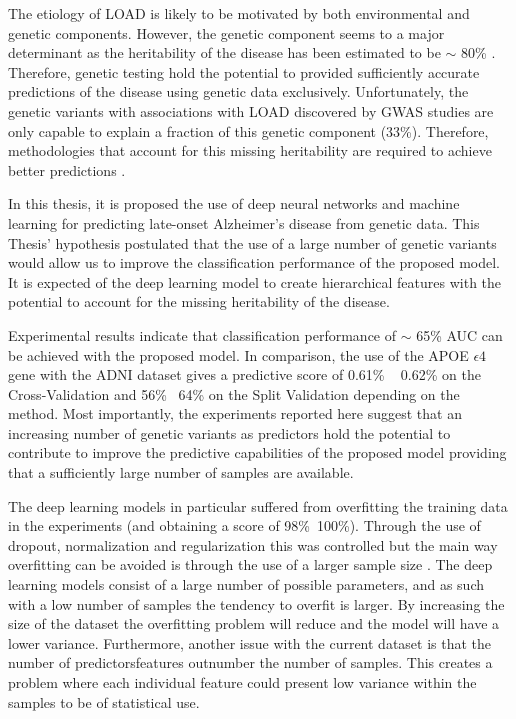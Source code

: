 The etiology of LOAD is likely to be motivated by both environmental and genetic components. However, the genetic component seems to a major determinant as the heritability of the disease has been estimated to be $\sim$ 80\% \cite{Raghavan2017}. Therefore, genetic testing hold the potential to provided sufficiently accurate predictions of the disease using genetic data exclusively. Unfortunately, the genetic variants with associations with LOAD discovered by GWAS studies are only capable to explain a fraction of this genetic component (33\%). Therefore, methodologies that account for this missing heritability are required to achieve better predictions \cite{Escott015} \cite{Escott2017}.

In this thesis, it is proposed the use of deep neural networks and machine learning  for predicting late-onset Alzheimer's disease from genetic data. This Thesis' hypothesis postulated that the use of a large number of genetic variants would allow us to improve the classification performance of the proposed model. It is expected of the deep learning model to create hierarchical features with the potential to account for the missing heritability of the disease.

Experimental results indicate that classification performance of $\sim$ 65\% AUC can be achieved with the proposed model. In comparison, the use of the APOE $\epsilon4$ gene with the ADNI dataset gives a predictive score of 0.61\% ~ 0.62\% on the Cross-Validation and 56\% ~64\% on the Split Validation depending on the method. Most importantly, the experiments reported here suggest that an increasing number of genetic variants as predictors hold the potential to contribute to improve the predictive capabilities of the proposed model providing that a sufficiently large number of samples are available. 


The deep learning models in particular suffered from overfitting the training data in the experiments (and obtaining a score of 98\%~100\%). Through the use of dropout, normalization and regularization this was controlled but the main way overfitting can be avoided is through the use of a larger sample size . The deep learning models consist of a large number of possible parameters, and as such with a low number of samples the tendency to overfit is larger. By increasing the size of the dataset the overfitting problem will reduce and the model will have a lower variance. Furthermore, another issue with the current dataset is that the number of predictors\/features outnumber the number of samples. This creates a problem where each individual feature could present low variance within the samples to be of statistical use. 

